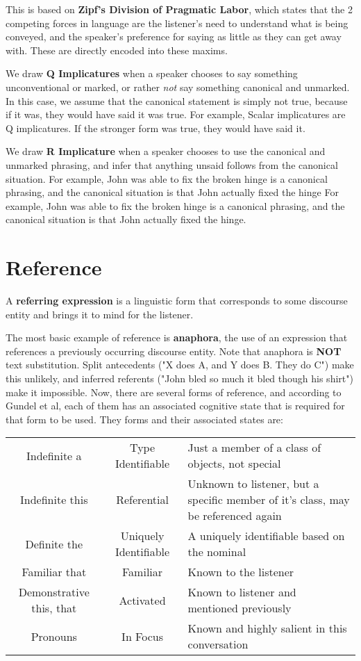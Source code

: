 \documentclass[11pt]{article}
\begin{document}
This is based on \textbf{Zipf's Division of Pragmatic Labor}, which states that the 2 competing forces in
language are the listener's need to understand what is being conveyed, and the speaker's preference for
saying as little as they can get away with. These are directly encoded into these maxims.

We draw \textbf{Q Implicatures} when a speaker chooses to say something unconventional or marked, or rather
\textit{not} say something canonical and unmarked. In this case, we assume that the canonical statement is
simply not true, because if it was, they would have said it was true. For example, Scalar implicatures are
Q implicatures. If the stronger form was true, they would have said it.

We draw \textbf{R Implicature} when a speaker chooses to use the canonical and unmarked phrasing, and infer
that anything unsaid follows from the canonical situation. For example, John was able to fix the broken hinge
is a canonical phrasing, and the canonical situation is that John actually fixed the hinge For example, 
John was able to fix the broken hinge is a canonical phrasing, and the canonical situation is that John 
actually fixed the hinge.

\section{Reference}

A \textbf{referring expression} is a linguistic form that corresponds to some discourse entity and brings 
it to mind for the listener.

The most basic example of reference is \textbf{anaphora}, the use of an expression that references a 
previously occurring discourse entity. Note that anaphora is \textbf{NOT} text substitution. Split 
antecedents ("X does A, and Y does B. They do C") make this unlikely, and inferred referents ("John bled so
much it bled though his shirt") make it impossible. 
Now, there are several forms of reference, and according to Gundel et al, each of them has an associated 
cognitive state that is required for that form to be used. They forms and their associated states are: \\
\begin{tabular}{c|c|p{4cm}}
Indefinite a & Type Identifiable & Just a member of a class of objects, not special \\
Indefinite this & Referential & Unknown to listener, but a specific member of it's class, may be referenced again\\
Definite the & Uniquely Identifiable & A uniquely identifiable based on the nominal\\
Familiar that & Familiar & Known to the listener\\
Demonstrative this, that & Activated & Known to listener and mentioned previously \\
Pronouns & In Focus & Known and highly salient in this conversation\\
\end{tabular}
\end{document}
